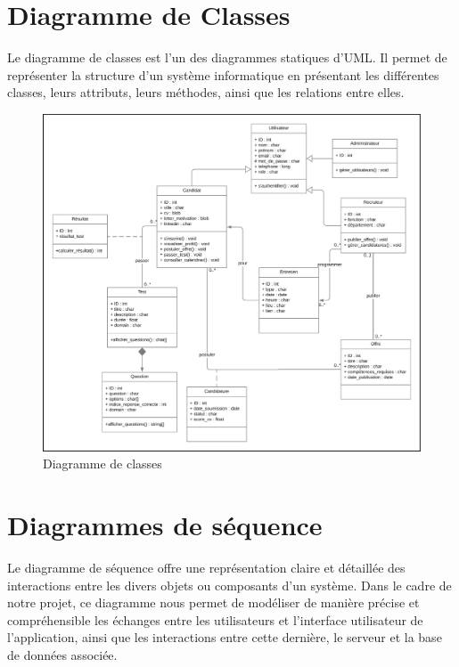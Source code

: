 \section{Diagramme de Classes}
Le diagramme de classes est l'un des diagrammes statiques d'UML. 
Il permet de représenter la structure d'un système informatique en 
présentant les différentes classes, leurs attributs, leurs méthodes, 
ainsi que les relations entre elles.

\begin{figure}[htbp]
   \centering
   \includegraphics[scale=0.3]{Images/classDiagram.png} %
   \caption{Diagramme de classes}
   \label{fig:ClassDiag}
\end{figure}



\section{Diagrammes de séquence}
Le diagramme de séquence offre une représentation claire 
et détaillée des interactions entre les divers objets ou 
composants d’un système. Dans le cadre de notre projet, 
ce diagramme nous permet de modéliser de manière précise et 
compréhensible les échanges entre les utilisateurs et l’interface 
utilisateur de l’application, ainsi que les interactions entre cette 
dernière, le serveur et la base de données associée.

